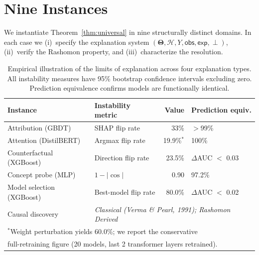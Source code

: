\documentclass[twoside]{jmlr}
\newcommand{\Params}{\mathbf{\Theta}}         %
\newcommand{\sH}{\mathcal{H}}
\newcommand{\incomp}{\perp}                  %
\begin{document}
\section{Nine Instances}
\label{sec:instances}

We instantiate Theorem~\ref{thm:universal} in nine structurally distinct
domains.  In each case we (i)~specify the explanation system
$(\Params, \sH, Y, \mathsf{obs}, \mathsf{exp}, \incomp)$, (ii)~verify the
Rashomon property, and (iii)~characterize the resolution.













\begin{table}[t]
\centering
\caption{Empirical illustration of the limits of explanation across four explanation types. All instability measures have 95\% bootstrap confidence intervals excluding zero. Prediction equivalence confirms models are functionally identical.}
\label{tab:cross-instance}
\begin{tabular}{llrl}
\toprule
Instance & Instability metric & Value & Prediction equiv. \\
\midrule
Attribution (GBDT) & SHAP flip rate & 33\% & $>$99\% \\
Attention (DistilBERT) & Argmax flip rate & 19.9\%$^{*}$ & 100\% \\
Counterfactual (XGBoost) & Direction flip rate & 23.5\% & $\Delta$AUC $<$ 0.03 \\
Concept probe (MLP) & $1 - |\cos|$ & 0.90 & 97.2\% \\
Model selection (XGBoost) & Best-model flip rate & 80.0\% & $\Delta$AUC $<$ 0.02 \\
Causal discovery & \multicolumn{3}{l}{\textit{Classical (Verma \& Pearl, 1991); Rashomon Derived}} \\
\bottomrule
\multicolumn{4}{l}{$^{*}$Weight perturbation yields 60.0\%; we report the conservative} \\
\multicolumn{4}{l}{\quad full-retraining figure (20 models, last 2 transformer layers retrained).} \\
\end{tabular}
\end{table}
\end{document}
